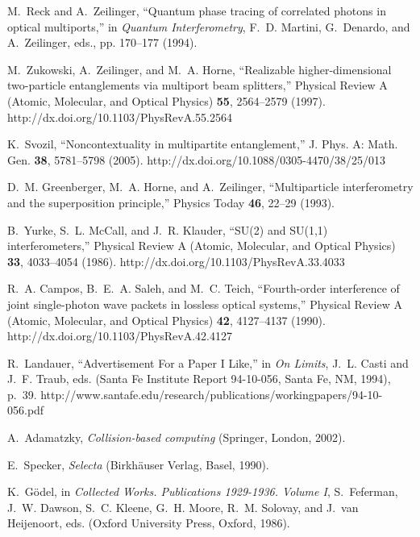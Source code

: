\documentclass[prl,amsfonts,amsmath,showpacs,showkeys,preprint]{revtex4}
\begin{document}
\begin{thebibliography}{10}
M.~Reck and A.~Zeilinger, \enquote{Quantum phase tracing of correlated photons
  in optical multiports,} in {\em Quantum Interferometry\/}, F.~D. Martini,
  G.~Denardo, and A.~Zeilinger, eds.,  pp. 170--177 (1994).

M.~Zukowski, A.~Zeilinger, and M.~A. Horne, \enquote{Realizable
  higher-dimensional two-particle entanglements via multiport beam splitters,}
  Physical Review A (Atomic, Molecular, and Optical Physics) {\bf 55},
  2564--2579 (1997).
\newline http://dx.doi.org/10.1103/PhysRevA.55.2564

K.~Svozil, \enquote{Noncontextuality in multipartite entanglement,} J. Phys. A:
  Math. Gen. {\bf 38}, 5781--5798 (2005).
\newline http://dx.doi.org/10.1088/0305-4470/38/25/013

D.~M. Greenberger, M.~A. Horne, and A.~Zeilinger, \enquote{Multiparticle
  interferometry and the superposition principle,} Physics Today {\bf 46},
  22--29 (1993).

B.~Yurke, S.~L. McCall, and J.~R. Klauder, \enquote{{SU(2)} and {SU(1,1)}
  interferometers,} Physical Review A (Atomic, Molecular, and Optical Physics)
  {\bf 33}, 4033--4054 (1986).
\newline http://dx.doi.org/10.1103/PhysRevA.33.4033

R.~A. Campos, B.~E.~A. Saleh, and M.~C. Teich, \enquote{Fourth-order
  interference of joint single-photon wave packets in lossless optical
  systems,} Physical Review A (Atomic, Molecular, and Optical Physics) {\bf
  42}, 4127--4137 (1990).
\newline http://dx.doi.org/10.1103/PhysRevA.42.4127

R.~Landauer, \enquote{Advertisement For a Paper {I} Like,} in {\em On
  Limits\/}, J.~L. Casti and J.~F. Traub, eds.  (Santa Fe Institute Report
  94-10-056, Santa Fe, NM, 1994), p.~39.
\newline
  http://www.santafe.edu/research/publications/workingpapers/94-10-056.pdf

A.~Adamatzky, {\em Collision-based computing\/} (Springer, London, 2002).

E.~Specker, {\em Selecta\/} (Birkh{\"{a}}user Verlag, Basel, 1990).

K.~G{\"{o}}del, in {\em Collected Works. Publications 1929-1936. Volume {I}\/},
  S.~Feferman, J.~W. Dawson, S.~C. Kleene, G.~H. Moore, R.~M. Solovay, and
  J.~van Heijenoort, eds.  (Oxford University Press, Oxford, 1986).

\end{thebibliography}
\end{document}
